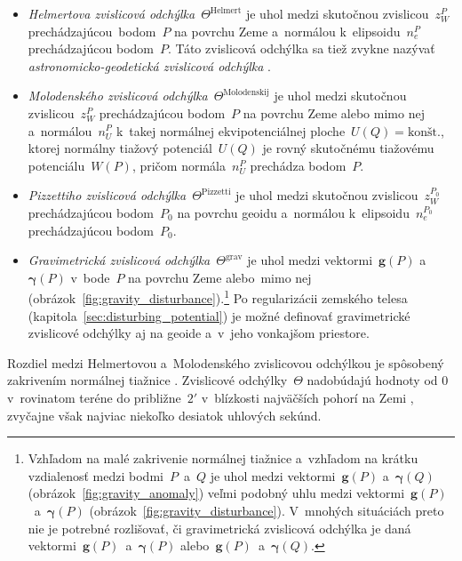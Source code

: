\documentclass[a4paper, 12pt]{book}
\let\vec\mathbf
\begin{document}
\begin{itemize}
\item \emph{Helmertova zvislicová odchýlka}~$\Theta^\mathrm{Helmert}$ je uhol 
medzi skutočnou zvislicou~$z_W^P$ prechádzajúcou~bodom~$P$ na povrchu Zeme 
a~normálou k~elipsoidu~$n_e^P$ prechádzajúcou bodom~$P$.  Táto zvislicová 
odchýlka sa tiež zvykne nazývať \textit{astronomicko-geodetická zvislicová 
odchýlka} \parencite{Jekeli1999b}.

\item \emph{Molodenského zvislicová odchýlka}~$\Theta^\mathrm{Molodenskij}$ je 
uhol medzi skutočnou zvislicou~$z_W^P$ prechádzajúcou bodom~$P$ na povrchu Zeme 
alebo mimo nej a~normálou~$n_U^P$ k~takej normálnej ekvipotenciálnej 
ploche~$U(Q) = \textrm{kon\v{s}t.}$, ktorej normálny tiažový potenciál~$U(Q)$ 
je rovný skutočnému tiažovému potenciálu~$W(P)$, pričom normála~$n_U^P$ 
prechádza bodom~$P$.

\item \emph{Pizzettiho zvislicová odchýlka}~$\Theta^\mathrm{Pizzetti}$ je uhol 
medzi skutočnou zvislicou~$z_W^{P_0}$ prechádzajúcou bodom~$P_0$ na povrchu 
geoidu a~normálou k~elipsoidu~$n_e^{P_0}$ prechádzajúcou bodom~$P_0$.

\item \emph{Gravimetrická zvislicová odchýlka}~$\Theta^\mathrm{grav}$ je uhol 
medzi vektormi~$\vec g(P)$ a~$\boldsymbol\gamma(P)$ v~bode~$P$ na povrchu Zeme 
alebo~mimo nej (obrázok~\ref{fig:gravity_disturbance}).\footnote{Vzhľadom na 
malé zakrivenie normálnej tiažnice a~vzhľadom na krátku vzdialenosť medzi 
bodmi~$P$~a~$Q$ je uhol medzi vektormi~$\vec g(P)$ a~$\boldsymbol\gamma(Q)$ 
(obrázok~\ref{fig:gravity_anomaly}) veľmi podobný uhlu medzi vektormi~$\vec 
g(P)$~a~$\boldsymbol\gamma(P)$ (obrázok~\ref{fig:gravity_disturbance}).  
V~mnohých situáciách preto nie je potrebné rozlišovať, či gravimetrická 
zvislicová odchýlka je daná vektormi~$\vec g(P)$~a~$\boldsymbol\gamma(P)$ 
alebo~$\vec g(P)$~a~$\boldsymbol\gamma(Q)$.}  Po regularizácii zemského telesa 
(kapitola~\ref{sec:disturbing_potential}) je možné definovať gravimetrické 
zvislicové odchýlky aj na geoide a~v~jeho vonkajšom priestore.
\end{itemize}
%
Rozdiel medzi Helmertovou a~Molodenského zvislicovou odchýlkou je spôsobený 
zakrivením normálnej tiažnice \parencite{Jekeli1999b}.  Zvislicové 
odchýlky~$\Theta$ nadobúdajú hodnoty od $0$ v~rovinatom teréne do 
približne~$2'$ v~blízkosti najväčších pohorí na Zemi \parencite{GGMplus}, 
zvyčajne však najviac niekoľko desiatok uhlových sekúnd.
\end{document}
